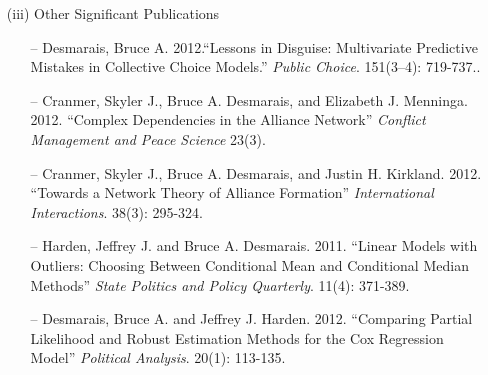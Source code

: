 \begin{enumerate}
\begin{enumerate}
\item[(iii)] Other Significant Publications
\begin{enumerate}
\item[--] Desmarais, Bruce A. 2012.``Lessons in Disguise: Multivariate Predictive Mistakes in Collective Choice Models.'' \emph{Public Choice}.  151(3--4): 719-737..
\item[--] Cranmer, Skyler J., Bruce A. Desmarais, and Elizabeth J. Menninga. 2012.  ``Complex Dependencies in the Alliance Network'' \emph{Conflict Management and  Peace Science} 23(3).
\item[--] Cranmer, Skyler J., Bruce A. Desmarais, and Justin H. Kirkland. 2012. ``Towards a Network Theory of Alliance Formation'' \emph{International Interactions}. 38(3): 295-324.
\item[--] Harden, Jeffrey J. and Bruce A. Desmarais. 2011. ``Linear Models with Outliers: Choosing Between Conditional Mean and Conditional Median Methods'' \emph{State Politics and Policy Quarterly}. 11(4): 371-389.
\item[--] Desmarais, Bruce A. and Jeffrey J. Harden. 2012. ``Comparing Partial Likelihood and Robust Estimation Methods for the Cox Regression Model'' \emph{Political Analysis}. 20(1): 113-135.
\end{enumerate}
\end{enumerate}


\end{enumerate}
